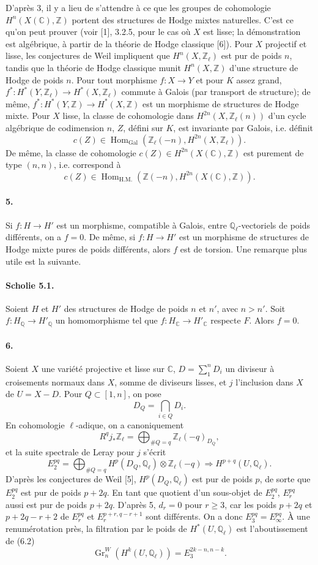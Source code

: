 \documentclass[10pt]{article}
\newcommand{\C}{\mathbb C}
\newcommand{\Q}{\mathbb Q}
\newcommand{\Z}{\mathbb Z}
\newcommand{\Ql}{\mathbb Q_\ell}
\newcommand{\Zl}{\mathbb Z_\ell}
\newcommand{\Gr}{\operatorname{Gr}}
\newcommand{\Gal}{\operatorname{Gal}}
\newcommand{\Hom}{\operatorname{Hom}}
\begin{document}
D'après 3, il y a lieu de s'attendre à ce que les groupes de cohomologie $H^n(X(\C),\Z)$ portent des structures de Hodge mixtes naturelles. C'est ce qu'on peut prouver (voir [1], 3.2.5, pour le cas où $X$ est lisse; la démonstration est algébrique, à partir de la théorie de Hodge classique [6]). Pour $X$ projectif et lisse, les conjectures de Weil impliquent que $H^n(X,\Zl)$ est pur de poids $n$, tandis que la théorie de Hodge classique munit $H^n(X,\Z)$ d'une structure de Hodge de poids $n$. Pour tout morphisme $f:X\to Y$ et pour $K$ assez grand, $f^*:H^*(Y,\Zl)\to H^*(X,\Zl)$ commute à Galois (par transport de structure); de même, $f^*:H^*(Y,\Z)\to H^*(X,\Z)$ est un morphisme de structures de Hodge mixte. Pour $X$ lisse, la classe de cohomologie dans $H^{2n}(X,\Zl(n))$ d'un cycle algébrique de codimension $n$, $Z$, défini sur $K$, est invariante par Galois, i.e. définit
\[
c(Z)\in\Hom_{\Gal}(\Zl(-n),H^{2n}(X,\Zl)).
\]
De même, la classe de cohomologie $c(Z)\in H^{2n}(X(\C),\Z)$ est purement de type $(n,n)$, i.e. correspond à
\[
c(Z)\in\Hom_{\mathrm{H.M.}}(\Z(-n),H^{2n}(X(\C),\Z)).
\]

\paragraph{5.} Si $f:H\to H'$ est un morphisme, compatible à Galois, entre $\Ql$-vectoriels de poids différents, on a $f=0$. De même, si $f:H\to H'$ est un morphisme de structures de Hodge mixte pures de poids différents, alors $f$ est de torsion. Une remarque plus utile est la suivante.

\paragraph{Scholie 5.1.} Soient $H$ et $H'$ des structures de Hodge de poids $n$ et $n'$, avec $n>n'$. Soit $f:H_\Q\to H'_\Q$ un homomorphisme tel que $f:H_\C\to H'_\C$ respecte $F$. Alors $f=0$.

\paragraph{6.} Soient $X$ une variété projective et lisse sur $\C$, $D=\sum_1^n D_i$ un diviseur à croisements normaux dans $X$, somme de diviseurs lisses, et $j$ l'inclusion dans $X$ de $U=X-D$. Pour $Q\subset[1,n]$, on pose
\[
D_Q=\bigcap_{i\in Q}D_i.
\]
En cohomologie $\ell$-adique, on a canoniquement
\[
\tag{6.1}
R^qj_*\Zl=\bigoplus_{\#Q=q}\Zl(-q)_{D_Q},
\]
et la suite spectrale de Leray pour $j$ s'écrit
\[
\tag{6.2}
E_2^{pq}=\bigoplus_{\#Q=q}H^p(D_Q,\Ql)\otimes\Zl(-q)\Rightarrow H^{p+q}(U,\Ql).
\]
D'après les conjectures de Weil [5], $H^p(D_Q,\Ql)$ est pur de poids $p$, de sorte que $E_2^{pq}$ est pur de poids $p+2q$. En tant que quotient d'un sous-objet de $E_2^{pq}$, $E_r^{pq}$ aussi est pur de poids $p+2q$. D'après 5, $d_r=0$ pour $r\ge3$, car les poids $p+2q$ et $p+2q-r+2$ de $E_r^{pq}$ et $E_r^{p+r,q-r+1}$ sont différents. On a donc $E_3^{pq}=E_\infty^{pq}$. À une renumérotation près, la filtration par le poids de $H^*(U,\Ql)$ est l'aboutissement de (6.2)
\[
\tag{6.3}
\Gr_n^W(H^k(U,\Ql))=E_3^{2k-n,n-k}.
\]
\end{document}
